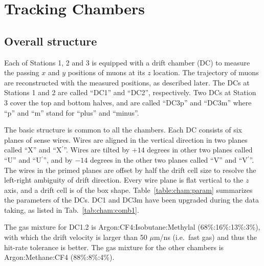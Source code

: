 \section{Tracking Chambers}

\subsection{Overall structure}

Each of Stations 1, 2 and 3 is equipped with a drift chamber (DC)
to measure the passing $x$ and $y$ positions of muons at its $z$ location.
The trajectory of muons are reconstructed with the measured positions,
as described later.
The DCs at Stations 1 and 2 are called ``DC1'' and ``DC2'', respectively.
Two DCs at Station 3 cover the top and bottom halves,
and are called ``DC3p'' and ``DC3m''
where ``p'' and ``m'' stand for ``plus'' and ``minus''.

The basic structure is common to all the chambers.
Each DC consists of six planes of sense wires.
Wires are aligned in the vertical direction
in two planes called ``X'' and ``X$^\prime$''.
Wires are tilted
by $+14$ degrees in other two planes called  ``U'' and ``U$^\prime$'', and
by $-14$ degrees in the other two planes called ``V'' and ``V$^\prime$''.
The wires in the primed planes are offset by half the drift cell size
to resolve the left-right ambiguity of drift direction.
Every wire plane is flat vertical to the $z$ axis, and a drift cell is of the box shape.
Table~\ref{table:cham:param} summarizes the parameters of the DCs.
DC1 and DC3m have been upgraded during the data taking,
as listed in Tab.~\ref{tab:cham:comb1}.

The gas mixture for DC1.2 is Argon:CF4:Isobutane:Methylal
(68\%:16\%:13\%:3\%), %
with which the drift velocity is larger than 50 $\mu$m/ns (i.e.~fast gas)
and thus the hit-rate tolerance is better.
The gas mixture for the other chambers is
Argon:Methane:CF4 (88\%:8\%:4\%).

